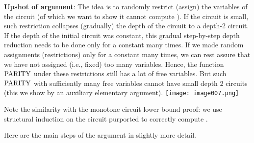 \textbf{Upshot of argument}: The idea is to randomly restrict (assign) the variables of the circuit (of which we want to show it cannot compute \Parity). If the circuit is small, such restriction collapses (gradually) the depth of the circuit to a depth-2 circuit. If the depth of the initial circuit was constant, this gradual step-by-step depth reduction needs to be done only for a constant many times. If we made random assignments (restrictions) only for a constant many times, we can rest assure that we have not assigned (i.e., fixed) too many variables. Hence, the function $\operatorname{PARITY}$ under these restrictions still has a lot of free variables. But such $\operatorname{PARITY}$ with sufficiently many free variables cannot have small depth 2 circuits (this we show by an auxiliary elementary argument).
\texttt{[image: image007.png]}


Note the similarity with the monotone circuit lower bound proof: we use structural induction on the circuit purported to correctly compute \Parity. 

Here are the main steps of the argument in slightly more detail.


